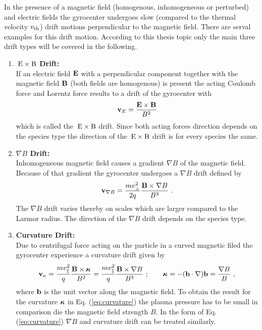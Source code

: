 In the presence of a magnetic field (homogenous, inhomogeneous or perturbed) and electric fields the gyrocenter undergoes slow (compared to the thermal velocity $v_{\mathrm{th}}$) drift motions perpendicular to the magnetic field. There are serval examples for this drift motion. According to this thesis topic only the main three drift types will be covered in the following.

\begin{enumerate}
    \item \textbf{$\mathrm{\:E}\times\mathrm{B}$ Drift:}\\
    If an electric field $\boldsymbol{\mathbf{E}}$ with a perpendicular component together with the magnetic field $\boldsymbol{\mathbf{B}}$ (both fields are homogenous) is present the acting Coulomb force and Lorentz force results to a drift of the gyrocenter with
    \begin{gather}
        \boldsymbol{\mathbf{v}}_{E} = \frac{\boldsymbol{\mathbf{E}}\times\boldsymbol{\mathbf{B}}}{B^2}
        \label{eq:exb}
    \end{gather}
    which is called the $\mathrm{\:E}\times\mathrm{B}$ drift. Since both acting forces direction depends on the species type the direction of the $\mathrm{\:E}\times\mathrm{B}$ drift is for every species the same.
    \item \textbf{$\nabla B$ Drift:}\\
    Inhomogeneous magnetic field causes a gradient $\nabla B$ of the magnetic field. Because of that gradient the gyrocenter undergoes a $\nabla B$ drift defined by
    \begin{gather}
        \boldsymbol{\mathbf{v}}_{\nabla B} = \frac{m v^2_{\perp}}{2 q}\frac{\boldsymbol{\mathbf{B}}\times \nabla B}{B^3}~.
        \label{eq:gradB}
    \end{gather}
    The $\nabla B$ drift varies thereby on scales which are larger compared to the Larmor radius. The direction of the $\nabla B$ drift depends on the species type.
    \item \textbf{Curvature Drift:}\\
    Due to centrifugal force acting on the particle in a curved magnetic filed the gyrocenter experience a curvature drift given by
    \begin{gather}
        \boldsymbol{\mathbf{v}}_{\kappa} = \frac{m v^2_{\parallel}}{q}\frac{\boldsymbol{\mathbf{B}}\times \boldsymbol{\mathbf{\kappa}}}{B^2} = \frac{m v^2_{\parallel}}{q} \frac{\boldsymbol{\mathbf{B}}\times \nabla B}{B^3}~;\qquad\boldsymbol{\mathbf{\kappa}} = -(\boldsymbol{\mathbf{b}}\cdot \nabla)\boldsymbol{\mathbf{b}} = \frac{\nabla B}{B}~,
        \label{eq:curvature}
    \end{gather}
    where $\boldsymbol{\mathbf{b}}$ is the unit vector along the magnetic field. To obtain the result for the curvature $\boldsymbol{\mathbf{\kappa}}$ in Eq. (\ref{eq:curvature}) the plasma pressure has to be small in comparison die the magnetic field strength $B$. In the form of Eq. (\ref{eq:curvature}) $\nabla B$ and curvature drift can be treated similarly. \cite{Wesson2011}
\end{enumerate}



